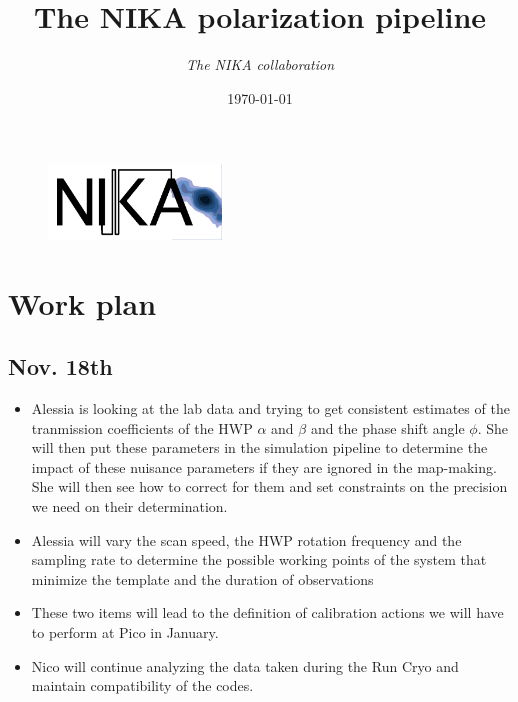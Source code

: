 \documentclass[a4paper]{article}
\title{\bf The NIKA polarization pipeline}           %
\author{{\it The NIKA collaboration}}
\date{\today}
\begin{document}
\maketitle                    %
\begin{figure}[!h]
\centering
\includegraphics[height=2cm,trim=0cm 0.1cm 0.1cm 0.1cm, clip=true]{Figures/nika_white_bg}
\end{figure}
\vspace*{0.5cm}

\setcounter{page}{1}
\setcounter{tocdepth}{1}

\section{Work plan}

\subsection{Nov. 18th}

\begin{itemize}
\item Alessia is looking at the lab data and trying to get consistent
  estimates of the tranmission coefficients of the HWP $\alpha$ and $\beta$ and
  the phase shift angle $\phi$. She will then put these parameters in the
  simulation pipeline to determine the impact of these nuisance parameters if they
  are ignored in the map-making. She will then see how to correct for them and set
  constraints on the precision we need on their determination.
\item Alessia will vary the scan speed, the HWP rotation frequency and the
  sampling rate to determine the possible working points of the system that
  minimize the template and the duration of observations
\item These two items will lead to the definition of calibration actions we
  will have to perform at Pico in January.
\item Nico will continue analyzing the data taken during the Run Cryo and
  maintain compatibility of the codes.
\end{itemize}
\end{document}
